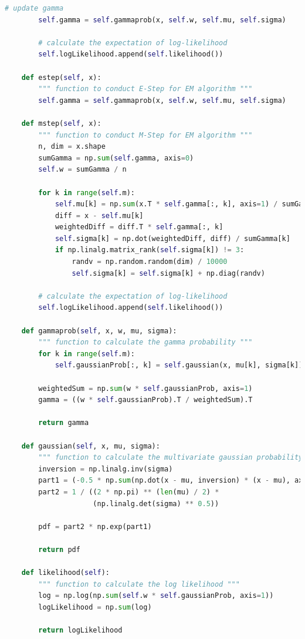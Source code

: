 \begin{description}
\begin{description}
\begin{lstlisting}[language=Python, caption=EM Algorithm Python Code]
        # update gamma
        self.gamma = self.gammaprob(x, self.w, self.mu, self.sigma)

        # calculate the expectation of log-likelihood
        self.logLikelihood.append(self.likelihood())

    def estep(self, x):
        """ function to conduct E-Step for EM algorithm """
        self.gamma = self.gammaprob(x, self.w, self.mu, self.sigma)

    def mstep(self, x):
        """ function to conduct M-Step for EM algorithm """
        n, dim = x.shape
        sumGamma = np.sum(self.gamma, axis=0)
        self.w = sumGamma / n

        for k in range(self.m):
            self.mu[k] = np.sum(x.T * self.gamma[:, k], axis=1) / sumGamma[k]
            diff = x - self.mu[k]
            weightedDiff = diff.T * self.gamma[:, k]
            self.sigma[k] = np.dot(weightedDiff, diff) / sumGamma[k]
            if np.linalg.matrix_rank(self.sigma[k]) != 3:
                randv = np.random.random(dim) / 10000
                self.sigma[k] = self.sigma[k] + np.diag(randv)

        # calculate the expectation of log-likelihood
        self.logLikelihood.append(self.likelihood())

    def gammaprob(self, x, w, mu, sigma):
        """ function to calculate the gamma probability """
        for k in range(self.m):
            self.gaussianProb[:, k] = self.gaussian(x, mu[k], sigma[k])

        weightedSum = np.sum(w * self.gaussianProb, axis=1)
        gamma = ((w * self.gaussianProb).T / weightedSum).T

        return gamma

    def gaussian(self, x, mu, sigma):
        """ function to calculate the multivariate gaussian probability """
        inversion = np.linalg.inv(sigma)
        part1 = (-0.5 * np.sum(np.dot(x - mu, inversion) * (x - mu), axis=1))
        part2 = 1 / ((2 * np.pi) ** (len(mu) / 2) *
                     (np.linalg.det(sigma) ** 0.5))

        pdf = part2 * np.exp(part1)

        return pdf

    def likelihood(self):
        """ function to calculate the log likelihood """
        log = np.log(np.sum(self.w * self.gaussianProb, axis=1))
        logLikelihood = np.sum(log)

        return logLikelihood


\end{lstlisting}
\end{description}
\end{description}
